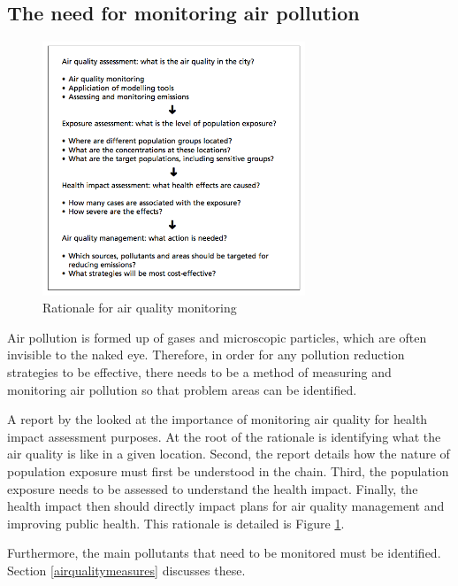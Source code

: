 \documentclass[11pt]{report}
\begin{document}
\subsection{The need for monitoring air pollution}

\begin{figure}[!htb]
\centering
\includegraphics[width=0.7\textwidth]{Rationale_for_air_quality_monitoring}
\caption{Rationale for air quality monitoring \citep{WHO2002ambientmonitoring}}
\label{rationaleformonitoring}
\end{figure}


Air pollution is formed up of gases and microscopic particles, which are often invisible to the naked eye. Therefore, in order for any pollution reduction strategies to be effective, there needs to be a method of measuring and monitoring air pollution so that problem areas can be identified.

A report by the \cite{WHO2002ambientmonitoring} looked at the importance of monitoring air quality for health impact assessment purposes. At the root of the rationale is identifying what the air quality is like in a given location. Second, the report details how the nature of population exposure must first be understood in the chain. Third, the population exposure needs to be assessed to understand the health impact. Finally, the health impact then should directly impact plans for air quality management and improving public health. This rationale is detailed is Figure \ref{rationaleformonitoring}.

Furthermore, the main pollutants that need to be monitored must be identified. Section \ref{airqualitymeasures} discusses these.
    
\end{document}
